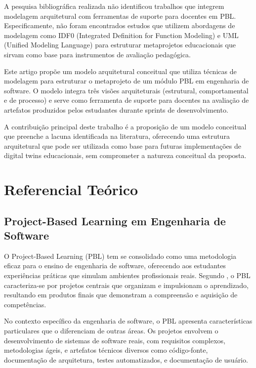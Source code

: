 \documentclass[english, spanish, brazilian]{RBIEarticle} %
\begin{document}
A pesquisa bibliográfica realizada não identificou trabalhos que integrem modelagem arquitetural com ferramentas de suporte para docentes em PBL. Especificamente, não foram encontrados estudos que utilizem abordagens de modelagem como IDF0 (Integrated Definition for Function Modeling) e UML (Unified Modeling Language) para estruturar metaprojetos educacionais que sirvam como base para instrumentos de avaliação pedagógica.

Este artigo propõe um modelo arquitetural conceitual que utiliza técnicas de modelagem para estruturar o metaprojeto de um módulo PBL em engenharia de software. O modelo integra três visões arquiteturais (estrutural, comportamental e de processo) e serve como ferramenta de suporte para docentes na avaliação de artefatos produzidos pelos estudantes durante sprints de desenvolvimento.

A contribuição principal deste trabalho é a proposição de um modelo conceitual que preenche a lacuna identificada na literatura, oferecendo uma estrutura arquitetural que pode ser utilizada como base para futuras implementações de digital twins educacionais, sem comprometer a natureza conceitual da proposta.

\section{Referencial Teórico}

\subsection{Project-Based Learning em Engenharia de Software}

O Project-Based Learning (PBL) tem se consolidado como uma metodologia eficaz para o ensino de engenharia de software, oferecendo aos estudantes experiências práticas que simulam ambientes profissionais reais. Segundo \parencite{Thomas2000}, o PBL caracteriza-se por projetos centrais que organizam e impulsionam o aprendizado, resultando em produtos finais que demonstram a compreensão e aquisição de competências.

No contexto específico da engenharia de software, o PBL apresenta características particulares que o diferenciam de outras áreas. Os projetos envolvem o desenvolvimento de sistemas de software reais, com requisitos complexos, metodologias ágeis, e artefatos técnicos diversos como código-fonte, documentação de arquitetura, testes automatizados, e documentação de usuário.
\end{document}
